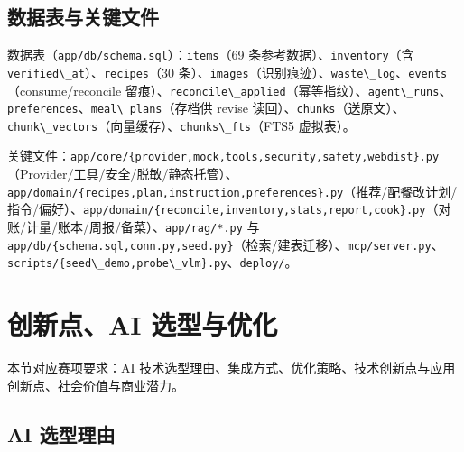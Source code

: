 \subsection{数据表与关键文件}\label{ux6570ux636eux8868ux4e0eux5173ux952eux6587ux4ef6}

数据表（\passthrough{\lstinline!app/db/schema.sql!}）：\passthrough{\lstinline!items!}（69
条参考数据）、\passthrough{\lstinline!inventory!}（含
\passthrough{\lstinline!verified\_at!}）、\passthrough{\lstinline!recipes!}（30
条）、\passthrough{\lstinline!images!}（识别痕迹）、\passthrough{\lstinline!waste\_log!}、\passthrough{\lstinline!events!}（consume/reconcile
留痕）、\passthrough{\lstinline!reconcile\_applied!}（幂等指纹）、\passthrough{\lstinline!agent\_runs!}、\passthrough{\lstinline!preferences!}、\passthrough{\lstinline!meal\_plans!}（存档供
revise
读回）、\passthrough{\lstinline!chunks!}（送原文）、\passthrough{\lstinline!chunk\_vectors!}（向量缓存）、\passthrough{\lstinline!chunks\_fts!}（FTS5
虚拟表）。

关键文件：\passthrough{\lstinline!app/core/\{provider,mock,tools,security,safety,webdist\}.py!}（Provider/工具/安全/脱敏/静态托管）、\passthrough{\lstinline!app/domain/\{recipes,plan,instruction,preferences\}.py!}（推荐/配餐改计划/指令/偏好）、\passthrough{\lstinline!app/domain/\{reconcile,inventory,stats,report,cook\}.py!}（对账/计量/账本/周报/备菜）、\passthrough{\lstinline!app/rag/*.py!}
与
\passthrough{\lstinline!app/db/\{schema.sql,conn.py,seed.py\}!}（检索/建表迁移）、\passthrough{\lstinline!mcp/server.py!}、\passthrough{\lstinline!scripts/\{seed\_demo,probe\_vlm\}.py!}、\passthrough{\lstinline!deploy/!}。

\section{创新点、AI 选型与优化}

本节对应赛项要求：AI 技术选型理由、集成方式、优化策略、技术创新点与应用创新点、社会价值与商业潜力。

\subsection{AI 选型理由}

